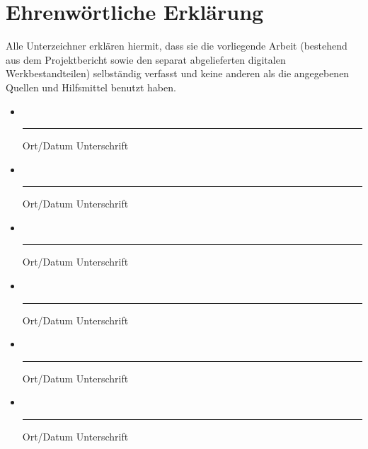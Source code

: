 \newcommand{\signentry}[1]{%
\item #1\\[1cm]
\mbox{}\newline\vspace{0.6cm}%
\parbox{13cm}{%
\mbox{}\centering\hrule\medskip Ort/Datum\hspace{5cm}%
Unterschrift}}
\flushleft
\pagestyle{empty}
\enlargethispage{2.5cm}
\section*{Ehrenwörtliche Erklärung}
Alle Unterzeichner erklären hiermit, dass sie die vorliegende Arbeit (bestehend aus dem Projektbericht sowie den separat abgelieferten digitalen Werkbestandteilen) selbständig verfasst und keine anderen als die angegebenen Quellen und Hilfsmittel benutzt haben.\\[2ex]

\begin{itemize}
\signentry{\AName}
\signentry{\BName}
\signentry{\CName}
\signentry{\DName}
\signentry{\EName}
\signentry{\FName}
\end{itemize}
